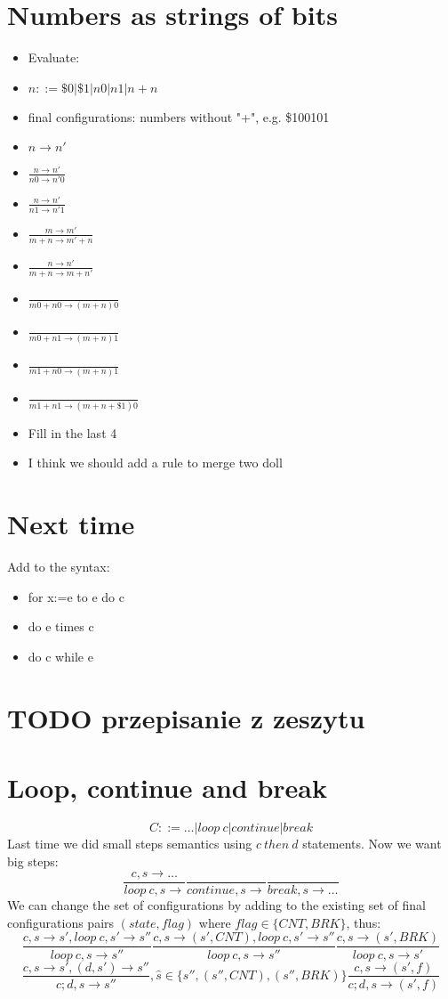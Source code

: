 \documentclass{article}
\begin{document}
\section{Numbers as strings of bits}
\begin{itemize}
	\item Evaluate:
	\item $n::=\$0|\$1|n 0|n 1|n + n$
	\item final configurations: numbers without "+", e.g. \$100101
	\item $ n\rightarrow n' $
	\item $\frac{n\rightarrow n'}{n0\rightarrow n'0}$
	\item $\frac{n\rightarrow n'}{n1\rightarrow n'1}$
	\item $\frac{m\rightarrow m'}{m+n\rightarrow m'+n}$
	\item $\frac{n\rightarrow n'}{m+n\rightarrow m+n'}$
	\item $\frac{}{m0+n0\rightarrow (m+n)0}$
	\item $\frac{}{m0+n1\rightarrow (m+n)1}$
	\item $\frac{}{m1+n0\rightarrow (m+n)1}$
	\item $\frac{}{m1+n1\rightarrow (m+n+\$1)0}$
	\item Fill in the last 4
	\item I think we should add a rule to merge two doll
\end{itemize}
\section{Next time}
Add to the syntax:
\begin{itemize}
	\item for x:=e to e do c 
	\item do e times c
	\item do c while e
\end{itemize}
\section{TODO przepisanie z zeszytu}
\section{Loop, continue and break}
$$C::=\ldots | loop\ c | continue | break$$
Last time we did small steps semantics using $c\ then\ d$ statements. Now we want big steps:
$$\frac{c,s\rightarrow\ldots}{loop\ c,s\rightarrow}\frac{}{continue,s\rightarrow}\frac{}{break,s\rightarrow\ldots}$$
We can change the set of configurations by adding to the existing set of final configurations pairs $(state, flag)$ where $flag\in \{CNT, BRK\}$, thus:
$$\frac{c,s\rightarrow s', loop\ c, s'\rightarrow s''}{loop\ c,s\rightarrow s''}
\frac{c,s\rightarrow (s', CNT), loop\ c, s'\rightarrow s''}{loop\ c,s\rightarrow s''}
\frac{c,s\rightarrow (s', BRK)}{loop\ c,s\rightarrow s'}$$
$$\frac{c,s\rightarrow s',(d,s')\rightarrow s'' }{c;d,s\rightarrow s''}, \hat s\in\{s'', (s'',CNT), (s'',BRK)\}
\frac{c,s\rightarrow (s', f)}{c;d,s\rightarrow (s', f)}
$$
\end{document}
